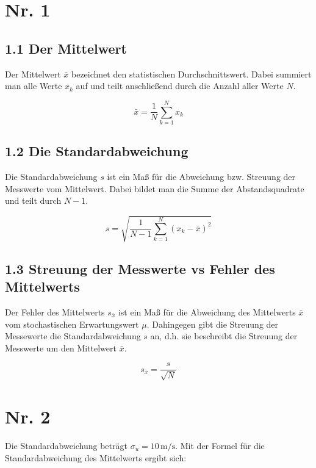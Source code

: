 \documentclass{scrartcl}
\begin{document}
\section*{Nr. 1}

\subsection*{1.1 Der Mittelwert}
Der Mittelwert $\bar{x}$ bezeichnet den statistischen Durchschnittswert. 
Dabei summiert man alle Werte $x_k$ auf und teilt anschließend durch die Anzahl aller Werte $N$.

\begin{equation}
    \bar{x} = \frac{1}{N} \sum_{k=1}^{N} x_k
\end{equation}

\subsection*{1.2 Die Standardabweichung}
Die Standardabweichung $s$ ist ein Maß für die Abweichung bzw. Streuung der Messwerte vom Mittelwert.
Dabei bildet man die Summe der Abstandsquadrate und teilt durch $N-1$.

\begin{equation}
    s = \sqrt{\frac{1}{N-1} \sum_{k=1}^{N} \left(x_k - \bar{x}\right)^2 }
\end{equation}

\subsection*{1.3 Streuung der Messwerte vs Fehler des Mittelwerts}
Der Fehler des Mittelwerts $s_{\bar{x}}$ ist ein Maß für die Abweichung des Mittelwerts $\bar{x}$ vom stochastischen Erwartungswert $\mu$.
Dahingegen gibt die Streuung der Messewerte die Standardabweichung $s$ an,
d.h. sie beschreibt die Streuung der Messwerte um den Mittelwert $\bar{x}$.

\begin{equation}
    s_{\bar{x}}=\frac{s}{\sqrt{N}}
\end{equation}

\section*{Nr. 2}
Die Standardabweichung beträgt $\sigma_u = 10\,\mathrm{m/s}$.
Mit der Formel für die Standardabweichung des Mittelwerts ergibt sich:
\end{document}
